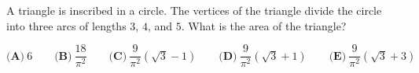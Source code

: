 A triangle is inscribed in a circle. The vertices of the triangle divide the circle into three arcs of lengths $3$, $4$, and $5$. What is the area of the triangle?

$\textbf{(A)}\ 6 \qquad
\textbf{(B)}\ \dfrac{18}{\pi^2} \qquad
\textbf{(C)}\ \dfrac{9}{\pi^2}\left(\sqrt{3}-1\right) \qquad
\textbf{(D)}\ \dfrac{9}{\pi^2}\left(\sqrt{3}+1\right) \qquad
\textbf{(E)}\ \dfrac{9}{\pi^2}\left(\sqrt{3}+3\right)$
